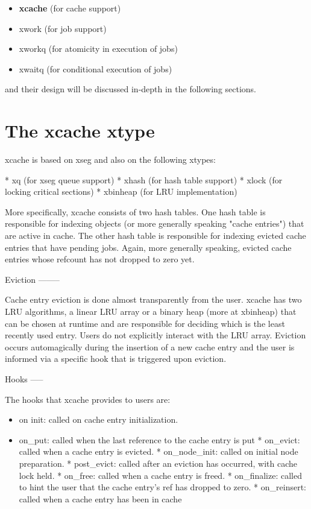\begin{itemize}
	\item \textbf{xcache} (for cache support)
	\item xwork (for job support)
	\item xworkq (for atomicity in execution of jobs)
	\item xwaitq (for conditional execution of jobs)
\end{itemize}

and their design will be discussed in-depth in the following sections.

\section{The xcache xtype}

xcache is based on xseg and also on the following xtypes:

* xq (for xseg queue support)
* xhash (for hash table support)
* xlock (for locking critical sections)
* xbinheap (for LRU implementation)

More specifically, xcache consists of two hash tables. One hash table is
responsible for indexing objects (or more generally speaking "cache entries")
that are active in cache. The other hash table is responsible for indexing
evicted cache entries that have pending jobs. Again, more generally speaking,
evicted cache entries whose refcount has not dropped to zero yet.

Eviction
--------

Cache entry eviction is done almost transparently from the user. xcache has two
LRU algorithms, a linear LRU array or a binary heap (more at xbinheap) that can
be chosen at runtime and are responsible for deciding which is the least
recently used entry. Users do not explicitly interact with the LRU array.
Eviction occurs automagically during the insertion of a new cache entry and the
user is informed via a specific hook that is triggered upon eviction.

Hooks
-----

The hooks that xcache provides to users are:

\begin{itemize}
\item on init: called on cache entry initialization.
\item on\_put: called when the last reference to the cache entry is put
* on\_evict: called when a cache entry is evicted.
* on\_node\_init: called on initial node preparation.
* post\_evict: called after an eviction has occurred, with cache lock held.
* on\_free: called when a cache entry is freed.
* on\_finalize: called to hint the user that the cache entry's ref has dropped
  to zero.
* on\_reinsert: called when a cache entry has been in cache
\end{itemize}

